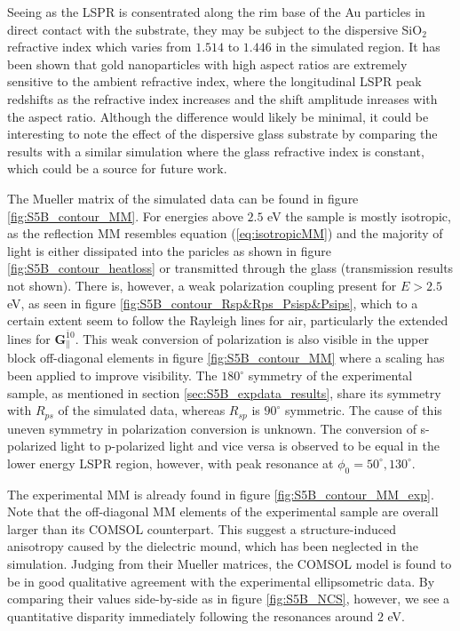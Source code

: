 Seeing as the LSPR is consentrated along the rim base of the Au particles in direct contact with the substrate, they may be subject to the dispersive SiO$_2$ refractive index which varies from $1.514$ to $1.446$ in the simulated region. It has been shown that gold nanoparticles with high aspect ratios are extremely sensitive to the ambient refractive index, where the longitudinal LSPR peak redshifts as the refractive index increases and the shift amplitude inreases with the aspect ratio\cite{LSPR_sensor_review}\cite{Au_nanorods_review}. Although the difference would likely be minimal, it could be interesting to note the effect of the dispersive glass substrate by comparing the results with a similar simulation where the glass refractive index is constant, which could be a source for future work.

The Mueller matrix of the simulated data can be found in figure \ref{fig:S5B_contour_MM}. For energies above $2.5$ eV the sample is mostly isotropic, as the reflection MM resembles equation (\ref{eq:isotropicMM}) and the majority of light is either dissipated into the paricles as shown in figure \ref{fig:S5B_contour_heatloss} or transmitted through the glass (transmission results not shown). There is, however, a weak polarization coupling present for $E>2.5$ eV, as seen in figure \ref{fig:S5B_contour_Rsp&Rps_Psisp&Psips}, which to a certain extent seem to follow the Rayleigh lines for air, particularly the extended lines for $\mathbf{G}_\parallel^{\bar{1}0}$. This weak conversion of polarization is also visible in the upper block off-diagonal elements in figure \ref{fig:S5B_contour_MM} where a scaling has been applied to improve visibility. The $180^\circ$ symmetry of the experimental sample, as mentioned in section \ref{sec:S5B_expdata_results}, share its symmetry with $R_{ps}$ of the simulated data, whereas $R_{sp}$ is $90^\circ$ symmetric. The cause of this uneven symmetry in polarization conversion is unknown. The conversion of s-polarized light to p-polarized light and vice versa is observed to be equal in the lower energy LSPR region, however, with peak resonance at $\phi_0=50^\circ, 130^\circ$.

The experimental MM is already found in figure \ref{fig:S5B_contour_MM_exp}. Note that the off-diagonal MM elements of the experimental sample are overall larger than its COMSOL counterpart. This suggest a structure-induced anisotropy caused by the dielectric mound, which has been neglected in the simulation. Judging from their Mueller matrices, the COMSOL model is found to be in good qualitative agreement with the experimental ellipsometric data. By comparing their values side-by-side as in figure \ref{fig:S5B_NCS}, however, we see a quantitative disparity immediately following the resonances around $2$ eV.

